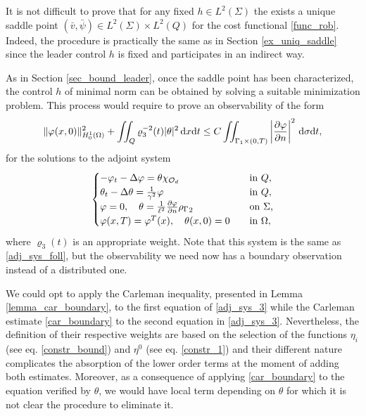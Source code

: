 \documentclass{aims}
\theoremstyle{definition}
\def\cbd{\Gamma}
\def\csbd{\rho_{\Gamma}}
\def\dx{\,\textnormal{d}x}
\def\dt{\textnormal{d}t}
\def\d{\,\textnormal{d}}
\begin{document}
It is not difficult to prove that for any fixed $h\in L^2(\Sigma)$ the exists a unique saddle point $(\bar v,\bar \psi)\in L^2(\Sigma)\times L^2(Q)$ for the cost functional \eqref{func_rob}. Indeed, the procedure is practically the same as in Section \ref{ex_uniq_saddle} since the leader control $h$ is fixed and participates in an indirect way. 

As in Section \ref{sec_bound_leader}, once the saddle point has been characterized, the control $h$ of minimal norm can be obtained by solving a suitable minimization problem. This process would require to prove an observability of the form
%
\begin{equation}\label{obs_ineq_sec3}
\|\varphi(x,0)\|^2_{H_0^1(\Omega)}+\iint_{Q}\varrho_3^{-2}(t)|\theta|^2\dx\dt\leq C\iint_{ \cbd_1\times(0,T)}\left|\frac{\partial\varphi}{\partial n}\right|^2\d\sigma\dt,
\end{equation}
%
 for the solutions to the adjoint system 
%
\begin{equation}\label{adj_sys_3}
\begin{cases}
-\varphi_t-\Delta \varphi= \theta\chi_{\mathcal O_d} \quad&\textnormal{in }Q, \\
\theta_t-\Delta \theta=\frac{1}{\gamma^2}\varphi \quad& \textnormal{in }Q, \\
\varphi=0, \quad \theta=\frac{1}{\ell^2}\frac{\partial \varphi}{\partial n}{\csbd}_2 \quad &\textnormal{on $\Sigma$,} \\
\varphi(x,T)=\varphi^T(x), \quad \theta(x,0)=0 \quad &\textnormal{in $\Omega$},
\end{cases}
\end{equation}
%
where $\varrho_3(t)$ is an appropriate weight. Note that this system is the same as \eqref{adj_sys_foll}, but the observability we need now has a boundary observation instead of a distributed one. 

We could opt to apply the Carleman inequality, presented in Lemma \ref{lemma_car_boundary}, to the first equation of \eqref{adj_sys_3} while the Carleman estimate \eqref{car_boundary} to the second equation in \eqref{adj_sys_3}. Nevertheless, the definition of their respective weights are based on the selection of the functions $\eta_i$ (see eq. \eqref{constr_bound}) and $\eta^0$ (see eq. \eqref{constr_1}) and their different nature complicates the absorption of the lower order terms at the moment of adding both estimates. Moreover, as a consequence of applying \eqref{car_boundary} to the equation verified by $\theta$, we would have local term depending on $\theta$ for which it is not clear the procedure to eliminate it. 
\end{document}
